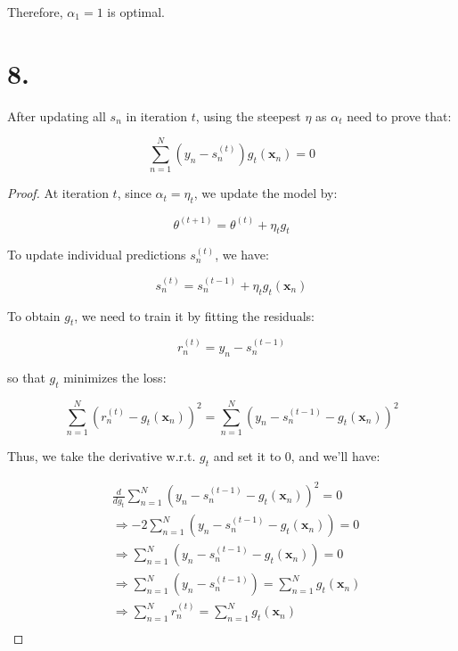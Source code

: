 \documentclass{article}
\begin{document}
Therefore, $\alpha_1 = 1$ is optimal.

\newpage

\section*{8.}

After updating all $s_n$ in iteration $t$, using the steepest $\eta$ as $\alpha_t$ need to prove that:

\begin{equation*}
    \sum_{n=1}^N (y_n -s_n^{(t)})g_t(\mathbf{x}_n) = 0
\end{equation*}

\begin{proof}
At iteration $t$, since $\alpha_t = \eta_t$, we update the model by:

\begin{equation*}
    \theta^{(t+1)} = \theta^{(t)} + \eta_t g_t
\end{equation*}

To update individual predictions $s_n^{(t)}$, we have:

\begin{equation*}
    s_n^{(t)} = s_n^{(t-1)} + \eta_t g_t(\mathbf{x}_n)
\end{equation*}

To obtain $g_t$, we need to train it by fitting the residuals:

\begin{equation*}
    r_n^{(t)} = y_n - s_n^{(t-1)}
\end{equation*}

so that $g_t$ minimizes the loss:

\begin{equation*}
    \sum_{n=1}^N \left(r_n^{(t)} - g_t(\mathbf{x}_n)\right)^2 = \sum_{n=1}^N \left(y_n - s_n^{(t-1)} - g_t(\mathbf{x}_n)\right)^2 
\end{equation*}

Thus, we take the derivative w.r.t. $g_t$ and set it to $0$, and we'll have:

\begin{equation*}
\begin{split}
    &\frac{d}{dg_t} \sum_{n=1}^N \left(y_n - s_n^{(t-1)} - g_t(\mathbf{x}_n)\right)^2 = 0 \\
    &\Rightarrow -2 \sum_{n=1}^N \left(y_n - s_n^{(t-1)} - g_t(\mathbf{x}_n)\right) = 0 \\
    &\Rightarrow \sum_{n=1}^N \left(y_n - s_n^{(t-1)} - g_t(\mathbf{x}_n)\right) = 0 \\
    &\Rightarrow \sum_{n=1}^N \left(y_n - s_n^{(t-1)}\right) = \sum_{n=1}^N g_t(\mathbf{x}_n) \\
    &\Rightarrow \sum_{n=1}^N r_n^{(t)} = \sum_{n=1}^N g_t(\mathbf{x}_n) \\
\end{split}
\end{equation*}


\end{proof}
\end{document}
